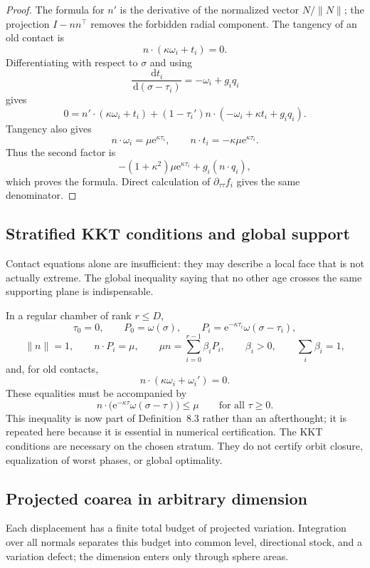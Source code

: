 \documentclass[10pt,a4paper]{article}
\newcommand{\dd}{\,\mathrm{d}}
\newcommand{\e}{\mathrm{e}}
\theoremstyle{plain}
\theoremstyle{definition}
\theoremstyle{remark}
\begin{document}
\begin{proof}
The formula for $n'$ is the derivative of the normalized vector $N/\|N\|$; the projection $I-nn^\top$ removes the forbidden radial component. The tangency of an old contact is
\[
  n\cdot(\kappa\omega_i+t_i)=0.
\]
Differentiating with respect to $\sigma$ and using
\[
  \frac{\dd t_i}{\dd(\sigma-\tau_i)}=-\omega_i+g_iq_i
\]
gives
\[
  0=n'\cdot(\kappa\omega_i+t_i)
    +(1-\tau_i')n\cdot(-\omega_i+\kappa t_i+g_iq_i).
\]
Tangency also gives
\[
  n\cdot\omega_i=\mu\e^{\kappa\tau_i},
  \qquad
  n\cdot t_i=-\kappa\mu\e^{\kappa\tau_i}.
\]
Thus the second factor is
\[
  -(1+\kappa^2)\mu\e^{\kappa\tau_i}+g_i(n\cdot q_i),
\]
which proves the formula. Direct calculation of $\partial_{\tau\tau}f_i$ gives the same denominator.
\end{proof}

\subsection{Stratified KKT conditions and global support}

Contact equations alone are insufficient: they may describe a local face that is not actually extreme. The global inequality saying that no other age crosses the same supporting plane is indispensable.

In a regular chamber of rank $r\le D$,
\[
  \tau_0=0,
  \qquad
  P_0=\omega(\sigma),
  \qquad
  P_i=\e^{-\kappa\tau_i}\omega(\sigma-\tau_i),
\]
\[
  \|n\|=1,
  \qquad
  n\cdot P_i=\mu,
  \qquad
  \mu n=\sum_{i=0}^{r-1}\beta_iP_i,
  \qquad
  \beta_i>0,
  \qquad
  \sum_i\beta_i=1,
\]
and, for old contacts,
\[
  n\cdot(\kappa\omega_i+\omega_i')=0.
\]
These equalities must be accompanied by
\[
  n\cdot\bigl(\e^{-\kappa\tau}\omega(\sigma-\tau)\bigr)\le\mu
  \qquad\text{for all }\tau\ge0.
\]
This inequality is now part of Definition~8.3 rather than an afterthought; it is repeated here because it is essential in numerical certification. The KKT conditions are necessary on the chosen stratum. They do not certify orbit closure, equalization of worst phases, or global optimality.

\subsection{Projected coarea in arbitrary dimension}

Each displacement has a finite total budget of projected variation. Integration over all normals separates this budget into common level, directional stock, and a variation defect; the dimension enters only through sphere areas.
\end{document}
